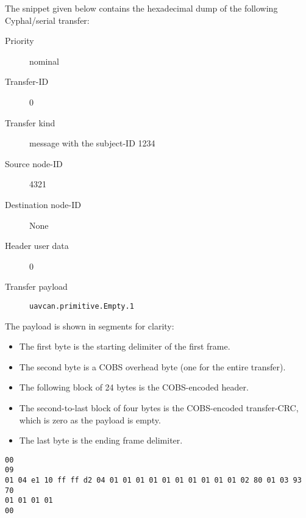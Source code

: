 \begin{remark}
    The snippet given below contains the hexadecimal dump of the following Cyphal/serial transfer:

    \begin{description}
        \item[Priority] nominal
        \item[Transfer-ID] 0
        \item[Transfer kind] message with the subject-ID 1234
        \item[Source node-ID] 4321
        \item[Destination node-ID] None
        \item[Header user data] 0
        \item[Transfer payload] \verb|uavcan.primitive.Empty.1|
    \end{description}

    The payload is shown in segments for clarity:

    \begin{itemize}
        \item The first byte is the starting delimiter of the first frame.
        \item The second byte is a COBS overhead byte (one for the entire transfer).
        \item The following block of 24 bytes is the COBS-encoded header.
        \item The second-to-last block of four bytes is the COBS-encoded transfer-CRC,
        which is zero as the payload is empty.
        \item The last byte is the ending frame delimiter.
    \end{itemize}

    \begin{verbatim}
00
09
01 04 e1 10 ff ff d2 04 01 01 01 01 01 01 01 01 01 01 02 80 01 03 93 70
01 01 01 01
00
    \end{verbatim}
\end{remark}
